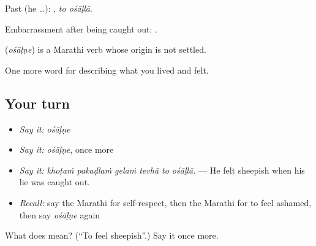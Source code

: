 Past (he …):  , \emph{to ośāḷlā}.

Embarrassment after being caught out:  .

\begin{cousinweb}
\textbf{} (\emph{ośāḷṇe}) is a Marathi verb whose origin is not settled.
\end{cousinweb}

\begin{grammarlens}[title={What you've built}]
One more word for describing what you lived and felt.
\end{grammarlens}

\subsection*{Your turn}
\begin{itemize}
\raggedright
  \item \emph{Say it:} \emph{ośāḷṇe}
  \item \emph{Say it:} \emph{ośāḷṇe}, once more
  \item \emph{Say it:} \emph{khoṭaṁ pakaḍlaṁ gelaṁ tevhā to ośāḷlā.} — He felt sheepish when his lie was caught out.
  \item \emph{Recall:} say the Marathi for self-respect, then the Marathi for to feel ashamed, then say \emph{ośāḷṇe} again
\end{itemize}

\begin{tcolorbox}[breakable,colback=teal!4,colframe=teal!35!black,title={Before you move on}]
What does  mean? (\textquotedblleft{}To feel sheepish\textquotedblright{}.) Say it once more.
\end{tcolorbox}
